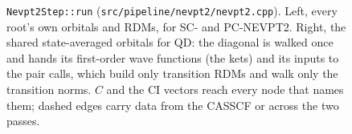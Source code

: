 \documentclass[11pt]{article}
\newcommand{\code}[1]{\texttt{#1}}
\begin{document}
\begin{figure}[p]
\caption{\code{Nevpt2Step::run} (\code{src/pipeline/nevpt2/nevpt2.cpp}).
Left, every root's own orbitals and RDMs, for SC- and PC-NEVPT2. Right, the
shared state-averaged orbitals for QD: the diagonal is walked once and hands
its first-order wave functions (the kets) and its inputs to the pair calls, which build only
transition RDMs and walk only the transition norms. $C$ and the CI vectors
reach every node that names them; dashed edges carry data from the CASSCF or
across the two passes.}
\label{fig:dag-step}
\end{figure}
\end{document}
